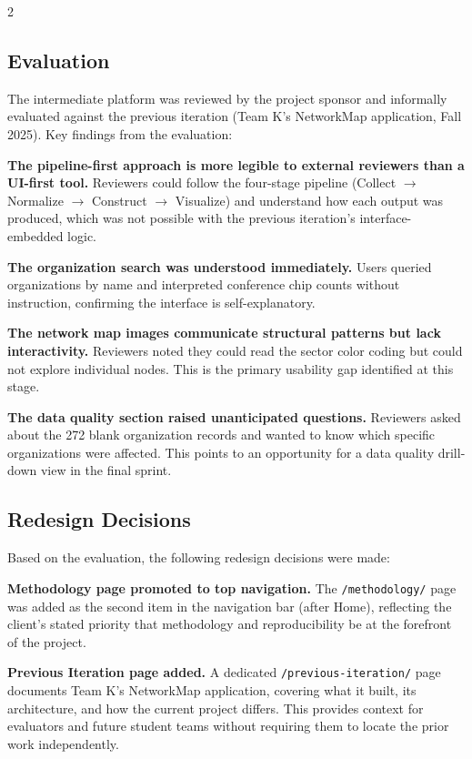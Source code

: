 \documentclass[11pt,letterpaper]{article}
\begin{document}
\begin{multicols}{2}
\subsection{Evaluation}

The intermediate platform was reviewed by the project sponsor and informally
evaluated against the previous iteration (Team K's NetworkMap application, Fall
2025). Key findings from the evaluation:

\textbf{The pipeline-first approach is more legible to external reviewers than a
UI-first tool.} Reviewers could follow the four-stage pipeline
(Collect $\to$ Normalize $\to$ Construct $\to$ Visualize) and understand how
each output was produced, which was not possible with the previous iteration's
interface-embedded logic.

\textbf{The organization search was understood immediately.} Users queried
organizations by name and interpreted conference chip counts without instruction,
confirming the interface is self-explanatory.

\textbf{The network map images communicate structural patterns but lack
interactivity.} Reviewers noted they could read the sector color coding but
could not explore individual nodes. This is the primary usability gap identified
at this stage.

\textbf{The data quality section raised unanticipated questions.} Reviewers
asked about the 272 blank organization records and wanted to know which specific
organizations were affected. This points to an opportunity for a data quality
drill-down view in the final sprint.

\subsection{Redesign Decisions}

Based on the evaluation, the following redesign decisions were made:

\textbf{Methodology page promoted to top navigation.} The \texttt{/methodology/}
page was added as the second item in the navigation bar (after Home), reflecting
the client's stated priority that methodology and reproducibility be at the
forefront of the project.

\textbf{Previous Iteration page added.} A dedicated
\texttt{/previous-iteration/} page documents Team K's NetworkMap application,
covering what it built, its architecture, and how the current project differs.
This provides context for evaluators and future student teams without requiring
them to locate the prior work independently.


\end{multicols}
\end{document}
